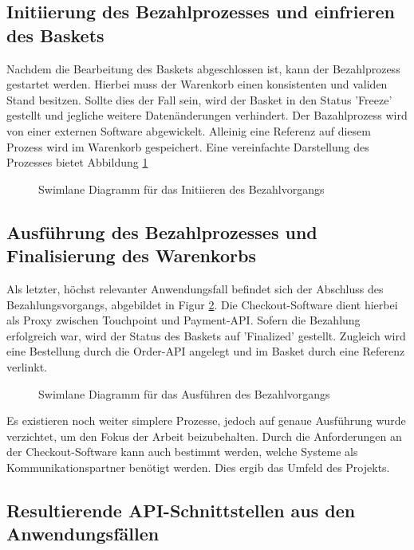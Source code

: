 \subsection{Initiierung des Bezahlprozesses und einfrieren des Baskets}

Nachdem die Bearbeitung des Baskets abgeschlossen ist, kann der Bezahlprozess gestartet werden. Hierbei muss der Warenkorb einen konsistenten und validen Stand besitzen. Sollte dies der Fall sein, wird der Basket in den Status 'Freeze' gestellt und jegliche weitere Datenänderungen verhindert. Der Bazahlprozess wird von einer externen Software abgewickelt. Alleinig eine Referenz auf diesem Prozess wird im Warenkorb gespeichert. Eine vereinfachte Darstellung des Prozesses bietet Abbildung \ref{fig:SL-InitPayment}

\begin{figure}[htbp]
	\centering
	
	\caption{Swimlane Diagramm für das Initiieren des Bezahlvorgangs }
	\label{fig:SL-InitPayment}
\end{figure}

\subsection{Ausführung des Bezahlprozesses und Finalisierung des Warenkorbs}

Als letzter, höchst relevanter Anwendungsfall befindet sich der Abschluss des Bezahlungsvorgangs, abgebildet in Figur \ref{fig:SL-ExecPayment}. Die Checkout-Software dient hierbei als Proxy zwischen Touchpoint und Payment-API. Sofern die Bezahlung erfolgreich war, wird der Status des Baskets auf 'Finalized' gestellt. Zugleich wird eine Bestellung durch die Order-API angelegt und im Basket durch eine Referenz verlinkt.

\begin{figure}[htbp]
	\centering
	
	\caption{Swimlane Diagramm für das Ausführen des Bezahlvorgangs }
	\label{fig:SL-ExecPayment}
\end{figure}

Es existieren noch weiter simplere Prozesse, jedoch auf genaue Ausführung wurde verzichtet, um den Fokus der Arbeit beizubehalten. Durch die Anforderungen an der Checkout-Software kann auch bestimmt werden, welche Systeme als Kommunikationspartner benötigt werden. Dies ergib das Umfeld des Projekts. 

\subsection{Resultierende API-Schnittstellen aus den Anwendungsfällen}

